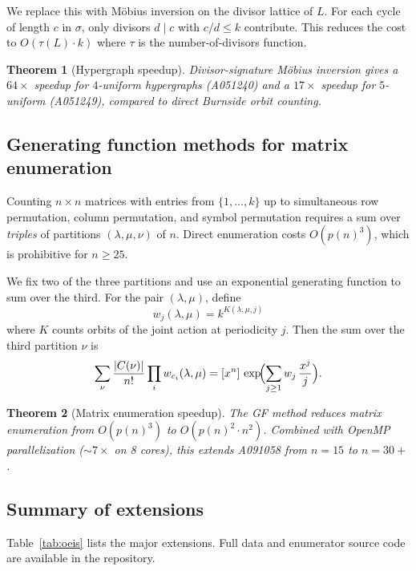 \documentclass[12pt,reqno]{amsart}
\theoremstyle{plain}
\newtheorem{theorem}{Theorem}[section]
\theoremstyle{definition}
\theoremstyle{remark}
\begin{document}
We replace this with M\"obius inversion on the divisor lattice of $L$. For
each cycle of length $c$ in $\sigma$, only divisors $d \mid c$ with $c/d \leq k$
contribute. This reduces the cost to $O(\tau(L) \cdot k)$ where $\tau$ is the
number-of-divisors function.

\begin{theorem}[Hypergraph speedup]
Divisor-signature M\"obius inversion gives a $64\times$ speedup for $4$-uniform
hypergraphs (A051240) and a $17\times$ speedup for $5$-uniform (A051249),
compared to direct Burnside orbit counting.
\end{theorem}

\subsection{Generating function methods for matrix enumeration}

Counting $n \times n$ matrices with entries from $\{1, \ldots, k\}$ up to
simultaneous row permutation, column permutation, and symbol permutation
requires a sum over \emph{triples} of partitions $(\lambda, \mu, \nu)$ of $n$.
Direct enumeration costs $O(p(n)^3)$, which is prohibitive for $n \geq 25$.

We fix two of the three partitions and use an exponential generating function
to sum over the third. For the pair $(\lambda, \mu)$, define
\[
w_j(\lambda, \mu) = k^{K(\lambda, \mu, j)}
\]
where $K$ counts orbits of the joint action at periodicity $j$. Then the
sum over the third partition $\nu$ is
\[
\sum_{\nu} \frac{|C(\nu)|}{n!} \prod_i w_{c_i}(\lambda, \mu)
= [x^n]\, \exp\!\Bigl(\sum_{j \geq 1} w_j \, \frac{x^j}{j}\Bigr).
\]

\begin{theorem}[Matrix enumeration speedup]
The GF method reduces matrix enumeration from $O(p(n)^3)$ to
$O(p(n)^2 \cdot n^2)$. Combined with OpenMP parallelization ($\sim 7\times$
on 8 cores), this extends A091058 from $n = 15$ to $n = 30+$.
\end{theorem}

\subsection{Summary of extensions}

Table~\ref{tab:oeis} lists the major extensions. Full data and enumerator
source code are available in the repository.
\end{document}
